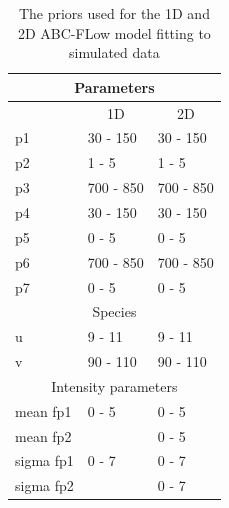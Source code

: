 \begin{table}[tb]
\centering
\caption{The priors used for the 1D and 2D ABC-FLow model fitting to simulated data}
\label{tab:priors_model}

\begin{tabular}{@{}lll@{}}
\toprule
\multicolumn{3}{c}{Parameters}                                         \\ \midrule
\multicolumn{1}{c}{} & \multicolumn{1}{c}{1D} & \multicolumn{1}{c}{2D} \\ \midrule
p1                   & 30 - 150               & 30 - 150               \\
p2                   & 1 - 5                  & 1 - 5                  \\
p3                   & 700 - 850              & 700 - 850              \\
p4                   & 30 - 150               & 30 - 150               \\
p5                   & 0 - 5                  & 0 - 5                  \\
p6                   & 700 - 850              & 700 - 850              \\
p7                   & 0 - 5                  & 0 - 5                  \\ \midrule
\multicolumn{3}{c}{Species}                                            \\ \midrule
u                    & 9 - 11                 & 9 - 11                 \\
v                    & 90 - 110               & 90 - 110               \\ \midrule
\multicolumn{3}{c}{Intensity parameters}                               \\ \midrule
mean fp1             & 0 - 5                  & 0 - 5                  \\
mean fp2             &                   & 0 - 5                  \\
sigma fp1            & 0 - 7                  & 0 - 7                  \\
sigma fp2            &                   & 0 - 7                  \\ \bottomrule
\end{tabular}

\end{table}

